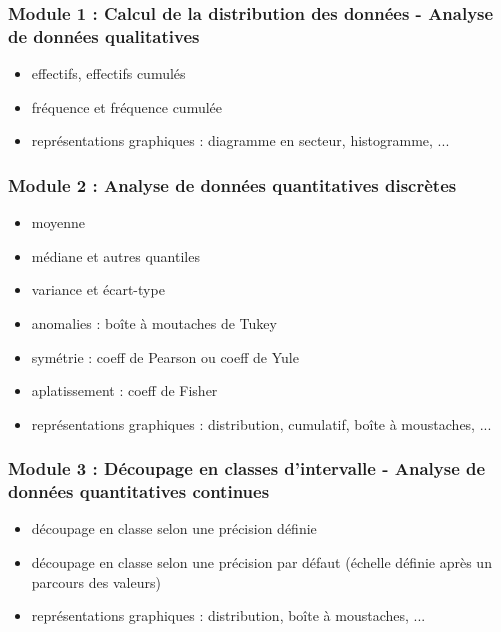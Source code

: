 				\subsubsection{Module 1 : Calcul de la distribution des données - Analyse de données qualitatives}
					\begin{itemize}
					\item effectifs, effectifs cumulés
					\item fréquence et fréquence cumulée
					\item représentations graphiques : diagramme en secteur, histogramme, ...
					\end{itemize}
				\subsubsection{Module 2 : Analyse de données quantitatives discrètes}
					\begin{itemize}
					\item moyenne
					\item médiane et autres quantiles
					\item variance et écart-type
					\item anomalies : boîte à moutaches de Tukey
					\item symétrie : coeff de Pearson ou coeff de Yule
					\item aplatissement : coeff de Fisher
					\item représentations graphiques : distribution, cumulatif,  boîte à moustaches, ...
					\end{itemize}
				\subsubsection{Module 3 : Découpage en classes d'intervalle - Analyse de données quantitatives continues}
					\begin{itemize}
					\item découpage en classe selon une précision définie
					\item découpage en classe selon une précision par défaut (échelle définie après un parcours des valeurs)
					\item représentations graphiques : distribution, boîte à moustaches, ...
					\end{itemize}
					

